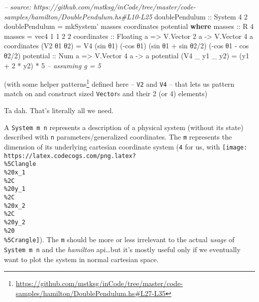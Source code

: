 \documentclass[]{article}
\newenvironment{Shaded}{}{}
\newcommand{\CommentTok}[1]{\textcolor[rgb]{0.38,0.63,0.69}{\textit{#1}}}
\newcommand{\DataTypeTok}[1]{\textcolor[rgb]{0.56,0.13,0.00}{#1}}
\newcommand{\DecValTok}[1]{\textcolor[rgb]{0.25,0.63,0.44}{#1}}
\newcommand{\FunctionTok}[1]{\textcolor[rgb]{0.02,0.16,0.49}{#1}}
\newcommand{\KeywordTok}[1]{\textcolor[rgb]{0.00,0.44,0.13}{\textbf{#1}}}
\newcommand{\NormalTok}[1]{#1}
\newcommand{\OtherTok}[1]{\textcolor[rgb]{0.00,0.44,0.13}{#1}}
\renewcommand{\href}[2]{#2\footnote{\url{#1}}}
\begin{document}
\begin{Shaded}
\begin{Highlighting}[]
\CommentTok{-- source: https://github.com/mstksg/inCode/tree/master/code-samples/hamilton/DoublePendulum.hs#L10-L25}
\OtherTok{doublePendulum ::} \DataTypeTok{System} \DecValTok{4} \DecValTok{2}
\NormalTok{doublePendulum }\FunctionTok{=}\NormalTok{ mkSystem' masses coordinates potential}
  \KeywordTok{where}
\OtherTok{    masses ::} \DataTypeTok{R} \DecValTok{4}
\NormalTok{    masses }\FunctionTok{=}\NormalTok{ vec4 }\DecValTok{1} \DecValTok{1} \DecValTok{2} \DecValTok{2}
\NormalTok{    coordinates}
\OtherTok{        ::} \DataTypeTok{Floating}\NormalTok{ a}
        \OtherTok{=>} \DataTypeTok{V.Vector} \DecValTok{2}\NormalTok{ a}
        \OtherTok{->} \DataTypeTok{V.Vector} \DecValTok{4}\NormalTok{ a}
\NormalTok{    coordinates (}\DataTypeTok{V2}\NormalTok{ θ1 θ2) }\FunctionTok{=} \DataTypeTok{V4}\NormalTok{ (sin θ1)            (}\FunctionTok{-}\NormalTok{cos θ1)}
\NormalTok{                                (sin θ1 }\FunctionTok{+}\NormalTok{ sin θ2}\FunctionTok{/}\DecValTok{2}\NormalTok{) (}\FunctionTok{-}\NormalTok{cos θ1 }\FunctionTok{-}\NormalTok{ cos θ2}\FunctionTok{/}\DecValTok{2}\NormalTok{)}
\NormalTok{    potential}
\OtherTok{        ::} \DataTypeTok{Num}\NormalTok{ a}
        \OtherTok{=>} \DataTypeTok{V.Vector} \DecValTok{4}\NormalTok{ a}
        \OtherTok{->}\NormalTok{ a}
\NormalTok{    potential (}\DataTypeTok{V4}\NormalTok{ _ y1 _ y2) }\FunctionTok{=}\NormalTok{ (y1 }\FunctionTok{+} \DecValTok{2} \FunctionTok{*}\NormalTok{ y2) }\FunctionTok{*} \DecValTok{5}    \CommentTok{-- assuming g = 5}
\end{Highlighting}
\end{Shaded}

(with some
\href{https://github.com/mstksg/inCode/tree/master/code-samples/hamilton/DoublePendulum.hs\#L27-L35}{helper
patterns} defined here -- \texttt{V2} and \texttt{V4} -- that lets us pattern
match on and construct sized \texttt{Vector}s and their 2 (or 4) elements)

Ta dah. That's literally all we need.

A \texttt{System\ m\ n} represents a description of a physical system (without
its state) described with \texttt{n} parameters/generalized coordinates. The
\texttt{m} represents the dimension of its underlying cartesian coordinate
system (\texttt{4} for us, with
\texttt{[image: https://latex.codecogs.com/png.latex?\\\%5Clangle\\\%20x\_1\\\%2C\\\%20y\_1\\\%2C\\\%20x\_2\\\%2C\\\%20y\_2\\\%20\\\%5Crangle]}).
The \texttt{m} should be more or less irrelevant to the actual \emph{usage} of
\texttt{System\ m\ n} and the \emph{hamilton} api\ldots{}but it's mostly useful
only if we eventually want to plot the system in normal cartesian space.
\end{document}
